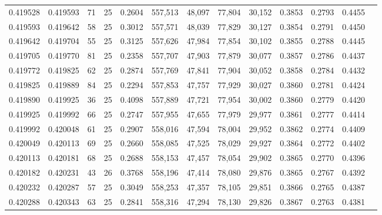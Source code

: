 \begin{tabular}{rrrrrrrrrrrrr}
0.419528 & 0.419593 &    71 &  25 &                                     0.2604 & 557,513 &  48,097 &  77,804 &  30,152 & 0.3853 & 0.2793 & 0.4455 \\
0.419593 & 0.419642 &    58 &  25 &                                     0.3012 & 557,571 &  48,039 &  77,829 &  30,127 & 0.3854 & 0.2791 & 0.4450 \\
0.419642 & 0.419704 &    55 &  25 &                                     0.3125 & 557,626 &  47,984 &  77,854 &  30,102 & 0.3855 & 0.2788 & 0.4445 \\
0.419705 & 0.419770 &    81 &  25 &                                     0.2358 & 557,707 &  47,903 &  77,879 &  30,077 & 0.3857 & 0.2786 & 0.4437 \\
0.419772 & 0.419825 &    62 &  25 &                                     0.2874 & 557,769 &  47,841 &  77,904 &  30,052 & 0.3858 & 0.2784 & 0.4432 \\
0.419825 & 0.419889 &    84 &  25 &                                     0.2294 & 557,853 &  47,757 &  77,929 &  30,027 & 0.3860 & 0.2781 & 0.4424 \\
0.419890 & 0.419925 &    36 &  25 &                                     0.4098 & 557,889 &  47,721 &  77,954 &  30,002 & 0.3860 & 0.2779 & 0.4420 \\
0.419925 & 0.419992 &    66 &  25 &                                     0.2747 & 557,955 &  47,655 &  77,979 &  29,977 & 0.3861 & 0.2777 & 0.4414 \\
0.419992 & 0.420048 &    61 &  25 &                                     0.2907 & 558,016 &  47,594 &  78,004 &  29,952 & 0.3862 & 0.2774 & 0.4409 \\
0.420049 & 0.420113 &    69 &  25 &                                     0.2660 & 558,085 &  47,525 &  78,029 &  29,927 & 0.3864 & 0.2772 & 0.4402 \\
0.420113 & 0.420181 &    68 &  25 &                                     0.2688 & 558,153 &  47,457 &  78,054 &  29,902 & 0.3865 & 0.2770 & 0.4396 \\
0.420182 & 0.420231 &    43 &  26 &                                     0.3768 & 558,196 &  47,414 &  78,080 &  29,876 & 0.3865 & 0.2767 & 0.4392 \\
0.420232 & 0.420287 &    57 &  25 &                                     0.3049 & 558,253 &  47,357 &  78,105 &  29,851 & 0.3866 & 0.2765 & 0.4387 \\
0.420288 & 0.420343 &    63 &  25 &                                     0.2841 & 558,316 &  47,294 &  78,130 &  29,826 & 0.3867 & 0.2763 & 0.4381 \\

\end{tabular}

